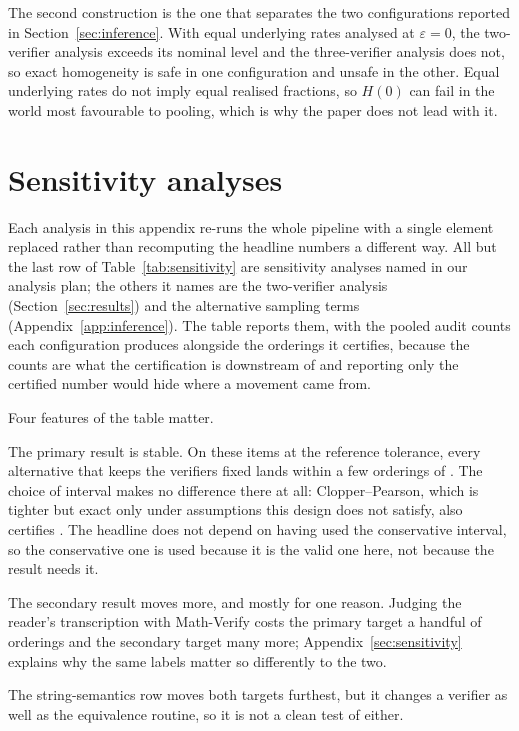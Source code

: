 The second construction is the one that separates the two configurations reported in
Section~\ref{sec:inference}. With equal underlying rates analysed at $\varepsilon = 0$, the
two-verifier analysis exceeds its nominal level and the three-verifier analysis does not, so
exact homogeneity is safe in one configuration and unsafe in the other. Equal underlying rates
do not imply equal realised fractions, so $H(0)$ can fail in the world most favourable to pooling,
which is why the paper does not lead with it.

\section{Sensitivity analyses}
\label{app:sensitivity}

Each analysis in this appendix re-runs the whole pipeline with a single element replaced rather
than recomputing the headline numbers a different way. All but the last row of
Table~\ref{tab:sensitivity} are sensitivity analyses named in our analysis plan; the others it
names are the two-verifier analysis (Section~\ref{sec:results}) and the alternative sampling terms
(Appendix~\ref{app:inference}). The table reports them, with the pooled audit counts each
configuration produces alongside the orderings it certifies, because the counts are what the
certification is downstream of and reporting only the certified number would hide where a
movement came from.



Four features of the table matter.

The primary result is stable. On these items at the reference tolerance, every alternative
that keeps the verifiers fixed lands within a few orderings of \CertFixedPrereg{}. The choice of
interval makes no difference there at all: Clopper--Pearson, which is tighter but exact only
under assumptions this design does not satisfy, also certifies \SensCpFixed{}. The headline does
not depend on having used the conservative interval, so the conservative one is used because it
is the valid one here, not because the result needs it.

The secondary result moves more, and mostly for one reason. Judging the reader's transcription
with Math-Verify costs the primary target a handful of orderings and the secondary target many
more;
Appendix~\ref{sec:sensitivity} explains why the same labels matter so differently to the two.

The string-semantics row moves both targets furthest, but it changes a verifier as well as the
equivalence routine, so it is not a clean test of either.

